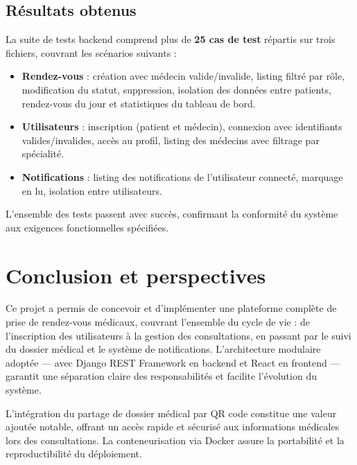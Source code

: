 \documentclass[12pt, a4paper]{article}
\begin{document}
\subsection{Résultats obtenus}

La suite de tests backend comprend plus de \textbf{25 cas de test} répartis sur trois fichiers, couvrant les scénarios suivants :

\begin{itemize}[nosep]
  \item \textbf{Rendez-vous} : création avec médecin valide/invalide, listing filtré par rôle, modification du statut, suppression, isolation des données entre patients, rendez-vous du jour et statistiques du tableau de bord.
  \item \textbf{Utilisateurs} : inscription (patient et médecin), connexion avec identifiants valides/invalides, accès au profil, listing des médecins avec filtrage par spécialité.
  \item \textbf{Notifications} : listing des notifications de l'utilisateur connecté, marquage en lu, isolation entre utilisateurs.
\end{itemize}

L'ensemble des tests passent avec succès, confirmant la conformité du système aux exigences fonctionnelles spécifiées.

\section{Conclusion et perspectives}

Ce projet a permis de concevoir et d'implémenter une plateforme complète de prise de rendez-vous médicaux, couvrant l'ensemble du cycle de vie : de l'inscription des utilisateurs à la gestion des consultations, en passant par le suivi du dossier médical et le système de notifications. L'architecture modulaire adoptée — avec Django REST Framework en backend et React en frontend — garantit une séparation claire des responsabilités et facilite l'évolution du système.

L'intégration du partage de dossier médical par QR code constitue une valeur ajoutée notable, offrant un accès rapide et sécurisé aux informations médicales lors des consultations. La conteneurisation via Docker assure la portabilité et la reproductibilité du déploiement.
\end{document}
